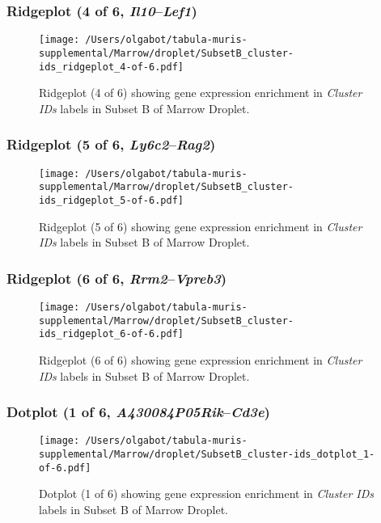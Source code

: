 \clearpage

\subsubsection{Ridgeplot (4 of 6, \emph{Il10}--\emph{Lef1})}
\begin{figure}[h]
\centering
\texttt{[image: /Users/olgabot/tabula-muris-supplemental/Marrow/droplet/SubsetB\_cluster-ids\_ridgeplot\_4-of-6.pdf]}

\caption{ Ridgeplot (4 of 6)  showing gene expression enrichment in \emph{Cluster IDs} labels in Subset B of Marrow Droplet. }
\end{figure}


\clearpage

\subsubsection{Ridgeplot (5 of 6, \emph{Ly6c2}--\emph{Rag2})}
\begin{figure}[h]
\centering
\texttt{[image: /Users/olgabot/tabula-muris-supplemental/Marrow/droplet/SubsetB\_cluster-ids\_ridgeplot\_5-of-6.pdf]}

\caption{ Ridgeplot (5 of 6)  showing gene expression enrichment in \emph{Cluster IDs} labels in Subset B of Marrow Droplet. }
\end{figure}


\clearpage

\subsubsection{Ridgeplot (6 of 6, \emph{Rrm2}--\emph{Vpreb3})}
\begin{figure}[h]
\centering
\texttt{[image: /Users/olgabot/tabula-muris-supplemental/Marrow/droplet/SubsetB\_cluster-ids\_ridgeplot\_6-of-6.pdf]}

\caption{ Ridgeplot (6 of 6)  showing gene expression enrichment in \emph{Cluster IDs} labels in Subset B of Marrow Droplet. }
\end{figure}


\clearpage

\subsubsection{Dotplot (1 of 6, \emph{A430084P05Rik}--\emph{Cd3e})}
\begin{figure}[h]
\centering
\texttt{[image: /Users/olgabot/tabula-muris-supplemental/Marrow/droplet/SubsetB\_cluster-ids\_dotplot\_1-of-6.pdf]}

\caption{ Dotplot (1 of 6)  showing gene expression enrichment in \emph{Cluster IDs} labels in Subset B of Marrow Droplet. }
\end{figure}


